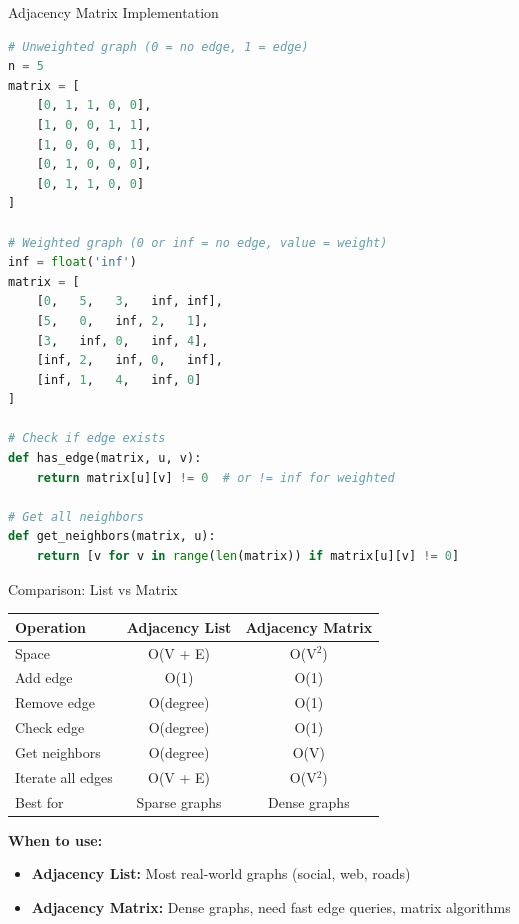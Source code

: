 \documentclass[aspectratio=169]{beamer}
\begin{document}
\begin{frame}[fragile]{Adjacency Matrix Implementation}
  \begin{lstlisting}[language=Python, basicstyle=\ttfamily\small]
# Unweighted graph (0 = no edge, 1 = edge)
n = 5
matrix = [
    [0, 1, 1, 0, 0],
    [1, 0, 0, 1, 1],
    [1, 0, 0, 0, 1],
    [0, 1, 0, 0, 0],
    [0, 1, 1, 0, 0]
]

# Weighted graph (0 or inf = no edge, value = weight)
inf = float('inf')
matrix = [
    [0,   5,   3,   inf, inf],
    [5,   0,   inf, 2,   1],
    [3,   inf, 0,   inf, 4],
    [inf, 2,   inf, 0,   inf],
    [inf, 1,   4,   inf, 0]
]

# Check if edge exists
def has_edge(matrix, u, v):
    return matrix[u][v] != 0  # or != inf for weighted

# Get all neighbors
def get_neighbors(matrix, u):
    return [v for v in range(len(matrix)) if matrix[u][v] != 0]
  \end{lstlisting}
\end{frame}

\begin{frame}{Comparison: List vs Matrix}
  \begin{table}
    \centering
    \begin{tabular}{|l|c|c|}
      \hline
      \textbf{Operation} & \textbf{Adjacency List} & \textbf{Adjacency Matrix} \\
      \hline
      Space & O(V + E) & O(V$^2$) \\
      \hline
      Add edge & O(1) & O(1) \\
      \hline
      Remove edge & O(degree) & O(1) \\
      \hline
      Check edge & O(degree) & O(1) \\
      \hline
      Get neighbors & O(degree) & O(V) \\
      \hline
      Iterate all edges & O(V + E) & O(V$^2$) \\
      \hline
      Best for & Sparse graphs & Dense graphs \\
      \hline
    \end{tabular}
  \end{table}

  \vspace{0.5cm}
  \textbf{When to use:}
  \begin{itemize}
    \item \textbf{Adjacency List:} Most real-world graphs (social, web, roads)
    \item \textbf{Adjacency Matrix:} Dense graphs, need fast edge queries, matrix algorithms
  \end{itemize}
\end{frame}
\end{document}
